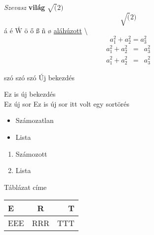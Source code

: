 \documentclass[]{article}
\begin{document}
\textit{Szevasz} \textbf{világ} $\sqrt(2)$
 $$\sqrt(2)$$
 \'a \'e \'W
 \"o
 \H{o}
 \ss
 \~n
 \o
 \underline{aláhúzott}
\textbackslash
\begin{equation}
	a_1^2+a_2^2=a_3^2
\end{equation}
\begin{eqnarray}
	a_1^2+a_2^2&=&a_3^2\\
	a_1^2+a_2^2&=&a_3^2
\end{eqnarray}
\iffalse
Ez a rész egy komment
és többsoros.
\fi
\begin{flushleft}
	\blindtext
\end{flushleft}
\begin{center}
	\blindtext
\end{center}
szó  szó                    szó
Új bekezdés \par
Ez is új bekezdés\\
Ez új sor \newline
Ez is új sor \linebreak
itt volt egy sortörés
\begin{itemize}
	\item Számozatlan
	\item Lista
\end{itemize}
\begin{enumerate}
	\item Számozott 
	\item Lista
\end{enumerate}
\caption{Táblázat címe}
\begin{tabular}{|l||cr|}
	E&R&T\\ \hline
	EEE&RRR&TTT\\ \hline
\end{tabular}
\end{document}
